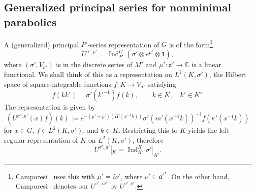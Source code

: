 \documentclass[11pt,oneside]{amsart}
\numberwithin{equation}{section}
\theoremstyle{remark}
\theoremstyle{plain}
\DeclareMathOperator{\Ind}{Ind}
\newcommand\CC{\mathbb{C}}
\newcommand\mfa{\mathfrak{a}}
\begin{document}
\subsection{Generalized principal series for nonminimal parabolics}\label{P'series} 
A (generalized) principal $P'$-series representation of $G$ is of the form\footnote{Camporesi~\cite{C} uses this with $\mu'=i\nu'$, where $\nu'\in\mfa'^*$. On the other hand, Camporesi~\cite{C} denotes our $U^{\sigma',i\nu'}$ by $U^{\sigma',\nu'}$.}
\[U^{\sigma',\mu'}=\Ind_{P'}^G(\sigma'\otimes e^{\mu'}\otimes\mathbf{1}),\]
where $(\sigma',V_{\sigma'})$ is in the discrete series of $M'$ and $\mu':\mfa'\to\CC$ is a linear functional. We shall think of this as a representation on $L^2(K,\sigma')$, the Hilbert space of square-integrable functions $f:K\to V_{\sigma'}$ satisfying
\[f(kk')=\sigma'(k'^{-1})f(k),\qquad k\in K,\quad k'\in K'.\]
The representation is given by
\[
(U^{\sigma',\mu'}(x)f)(k):=e^{-(\mu'+\rho')(H'(x^{-1}k))}\sigma'(m'(x^{-1}k))^{-1}f(\kappa'(x^{-1}k))
\]
for $x\in G$, $f\in L^2(K,\sigma')$, and $k\in K$. Restricting this to $K$ yields the left regular representation of $K$ on $L^2(K,\sigma')$, therefore
\begin{equation}\label{indres}
U^{\sigma',\mu'}|_K=\Ind_{K'}^K\sigma'|_{K'}.
\end{equation}
\end{document}
